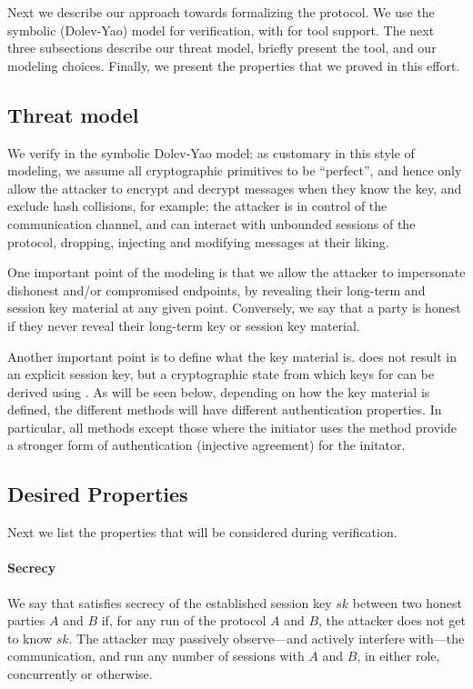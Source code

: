 Next we describe our approach towards formalizing the \mEdhoc{} protocol. We use the
symbolic (Dolev-Yao) model for verification, with \mTamarin{} for tool support.
%
The next three subsections describe our threat model, briefly present the
\mTamarin{} tool, and our modeling choices.
%
Finally, we present the properties that we proved in this effort.

\subsection{Threat model}\label{sec:threat-model}
We verify \mEdhoc{} in the symbolic Dolev-Yao model: as customary in this style of
modeling, we assume all cryptographic primitives to be ``perfect'', and hence
only allow the attacker to encrypt and decrypt messages when they know the key,
and exclude hash collisions, for example; the attacker is in control of the
communication channel, and can interact with unbounded sessions of the protocol,
dropping, injecting and modifying messages at their liking.

One important point of the modeling is that we allow the attacker to impersonate
dishonest and/or compromised endpoints, by revealing their long-term and session
key material at any given point.
%
Conversely, we say that a party is honest if they never reveal their
long-term key or session key material.

Another important point is to define what the key material is.
    \mEdhoc{} does not result in an explicit session key, but a cryptographic
    state from which keys for \mOscore{} can be derived using \mHkdf.
    As will be seen below, depending on how the key material is defined, the
    different methods will have different authentication properties.
    In particular, all methods except those where the initiator uses the
    \mStat{} method provide a stronger form of authentication (injective
    agreement) for the initator.


\subsection{Desired Properties}
\label{sec:desired-properties}
Next we list the properties that will be considered during verification.

\paragraph{Secrecy}
We say that \mEdhoc{} satisfies secrecy of the established session key $sk$
between two honest parties $A$ and $B$ if, for any run of the protocol $A$ and
$B$, the attacker does not get to know $sk$.
%
The attacker may passively observe---and actively interfere with---the
communication, and run any number of sessions with $A$ and $B$, in either role,
concurrently or otherwise.

